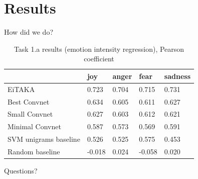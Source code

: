 \documentclass[10pt, utf8]{beamer}
\begin{document}
\section{Results}


\begin{frame}{How did we do?}
\begin{table}
\caption{Task 1.a results (emotion intensity regression), Pearson coefficient}
\label{tab:narrow-table}
\begin{center}
\begin{tabular}{lllll}
\toprule
& joy & anger & fear & sadness \\
\midrule
EiTAKA    & 0.723  & 0.704 & 0.715 & 0.731 \\
Best Convnet & 0.634 & 0.605 & 0.611 & 0.627 \\
Small Convnet & 0.627 & 0.603 & 0.612 & 0.621 \\
Minimal Convnet & 0.587 & 0.573 & 0.569 & 0.591 \\
SVM unigrams baseline & 0.526 & 0.525 & 0.575 & 0.453 \\
Random baseline & -0.018 & 0.024 & -0.058 & 0.020 \\
\bottomrule
\end{tabular}
\end{center}
\end{table}


\end{frame}

\begin{frame}[standout]
    Questions?
\end{frame}
\end{document}
